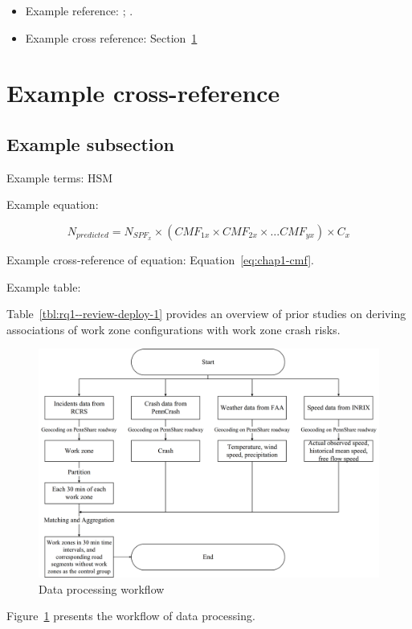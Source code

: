 
\begin{itemize}
  \item Example reference:
  \citep{zhangInferringCausalEffect2022,zhangEstimatingHeterogeneousTreatment2022,zhang2023effective};
  \citet{zhangInferringCausalEffect2022}.
  \item Example cross reference: Section~\ref{sec:chap1-motivation}
\end{itemize}

\hypertarget{Test}{%
  \section{Example cross-reference}\label{sec:chap1-motivation}}



\hypertarget{chap1-def-cmf}{%
  \subsection{Example subsection}\label{sec:chap1-def-cmf}}

Example terms: \Gls{HSM} 

Example equation:
  
\begin{equation}
    N_{predicted} = N_{SPF_{x}} \times \left( CMF_{1x} \times CMF_{2x} \times \ldots CMF_{yx} \right) \times C_{x}
\label{eq:chap1-cmf}
\end{equation}

Example cross-reference of equation: Equation~\ref{eq:chap1-cmf}.

Example table:




Table~\ref{tbl:rq1--review-deploy-1} provides an overview of prior studies on deriving associations
of work zone configurations with work zone crash risks. 


\begin{figure}[h]
  \centering
  \includegraphics[width=1\textwidth]{media/rq1/DataProcessing3.png}
  \caption{Data processing workflow}\label{fig:rq1-1:dataprocessingflow}
\end{figure}

Figure~\ref{fig:rq1-1:dataprocessingflow} presents the workflow of data processing.
  
